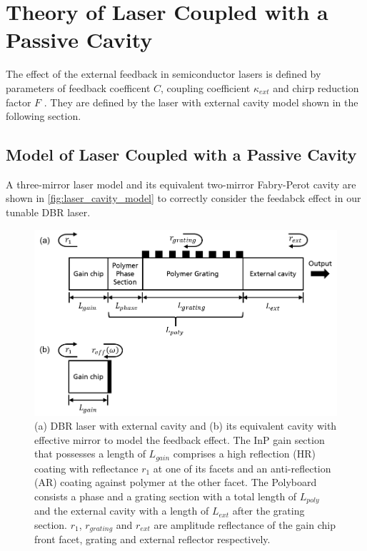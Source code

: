 \chapter{Theory of Laser Coupled with a Passive Cavity}\label{ch:Theory}
The effect of the external feedback in semiconductor lasers is defined by parameters of feedback coefficent $C$, coupling coefficient $\kappa_{ext}$ and chirp reduction factor $F$ \cite{kazarinov1987relation, petermann2012laser}. They are defined by the laser with external cavity model shown in the following section.

\section{Model of Laser Coupled with a Passive Cavity}\label{sec:model_laser}
A three-mirror laser model and its equivalent two-mirror Fabry-Perot cavity are shown in \autoref{fig:laser_cavity_model} to correctly consider the feedabck effect in our tunable DBR laser.

\begin{figure}[ht]
    \centering
    \includegraphics[width=.9\linewidth]{figures/laser_cavity_model.png}
    \caption{(a) DBR laser with external cavity and (b) its equivalent cavity with effective mirror to model the feedback effect. The InP gain section that possesses a length of $L_{gain}$ comprises a high reflection (HR) coating with reflectance $r_1$ at one of its facets and an anti-reflection (AR) coating against polymer at the other facet. The Polyboard consists a phase and a grating section with a total length of $L_{poly}$ and the external cavity with a length of $L_{ext}$ after the grating section. $r_1$, $r_{grating}$ and $r_{ext}$ are amplitude reflectance of the gain chip front facet, grating and external reflector respectively.}
    \label{fig:laser_cavity_model}
\end{figure}


